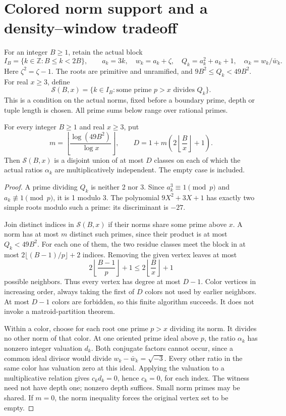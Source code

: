 \section{Colored norm support and a density--window tradeoff}
\label{ncs-section}

For an integer \(B\geq1\), retain the actual block
\[
 I_B=\{k\in\mathbb Z:B\leq k<2B\},\qquad
 a_k=3k,\quad w_k=a_k+\zeta,\quad
 Q_k=a_k^2+a_k+1,\quad \alpha_k=w_k/\bar w_k.
\]
Here \(\zeta^2=\zeta-1\). The roots are primitive and unramified,
and \(9B^2\leq Q_k<49B^2\). For real \(x\geq3\), define
\[
 \mathcal S(B,x)=\{k\in I_B:\text{some prime }p>x\text{ divides }Q_k\}.
\]
This is a condition on the actual norms, fixed before a boundary
prime, depth or tuple length is chosen. All prime sums below range
over rational primes.

\begin{theorem}\label{ncs-colors}
For every integer \(B\geq1\) and real \(x\geq3\), put
\[
 m=\left\lfloor\frac{\log(49B^2)}{\log x}\right\rfloor,
 \qquad D=1+m\left(2\left\lfloor\frac Bx\right\rfloor+1\right).
\]
Then \(\mathcal S(B,x)\) is a disjoint union of at most \(D\)
classes on each of which the actual ratios \(\alpha_k\) are
multiplicatively independent. The empty case is included.
\end{theorem}
\begin{proof}
A prime dividing \(Q_k\) is neither 2 nor 3. Since
\(a_k^3\equiv1\pmod p\) and \(a_k\not\equiv1\pmod p\), it is
1 modulo 3. The polynomial \(9X^2+3X+1\) has exactly two simple
roots modulo such a prime: its discriminant is \(-27\).

Join distinct indices in \(\mathcal S(B,x)\) if their norms share
some prime above \(x\). A norm has at most \(m\) distinct such
primes, since their product is at most \(Q_k<49B^2\).
For each one of them, the two residue classes meet the block in
at most \(2\lfloor(B-1)/p\rfloor+2\) indices. Removing the given
vertex leaves at most
\[
 2\left\lfloor\frac{B-1}p\right\rfloor+1
 \leq2\left\lfloor\frac Bx\right\rfloor+1
\]
possible neighbors. Thus every vertex has degree at most \(D-1\).
Color vertices in increasing order, always taking the first of
\(D\) colors not used by earlier neighbors. At most \(D-1\)
colors are forbidden, so this finite algorithm succeeds. It does
not invoke a matroid-partition theorem.

Within a color, choose for each root one prime \(p>x\) dividing
its norm. It divides no other norm of that color. At one oriented
prime ideal above \(p\), the ratio \(\alpha_k\) has nonzero
integer valuation \(d_k\). Both conjugate factors cannot occur,
since a common ideal divisor would divide
\(w_k-\bar w_k=\sqrt{-3}\). Every other ratio in the same color
has valuation zero at this ideal. Applying the valuation to a
multiplicative relation gives \(c_kd_k=0\), hence \(c_k=0\),
for each index. The witness need not have depth one; nonzero depth
suffices. Small norm primes may be shared. If \(m=0\), the
norm inequality forces the original vertex set to be empty.
\end{proof}

